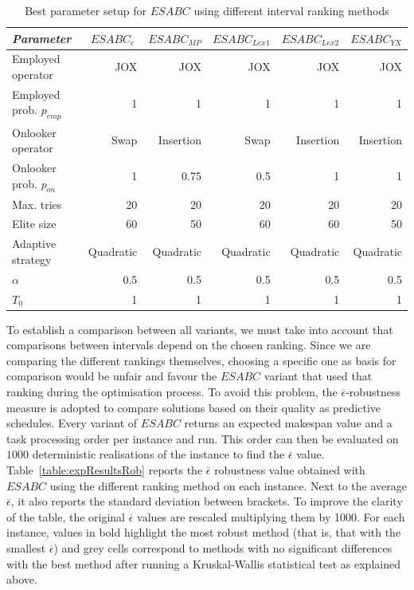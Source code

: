 \documentclass[icae]{iosart2x}
\newcommand{\reviewed}[1]{#1} %
\begin{document}
\begin{table}[tbh]
\small
\centering
\caption{\label{table:parameterTuning2} \reviewed{Best parameter setup for $ESABC$ using different interval ranking methods}}
\begin{tabular}{l|r|r|r|r|r}
\toprule
\textit{Parameter}  & \multicolumn{1}{c|}{$ESABC_c$} & \multicolumn{1}{c|}{$ESABC_{MP}$} & \multicolumn{1}{c|}{$ESABC_{Lex1}$} & \multicolumn{1}{c|}{$ESABC_{Lex2}$} & \multicolumn{1}{c}{$ESABC_{YX}$} \\
\midrule
Employed operator & JOX & JOX & JOX & JOX  & JOX  \\
Employed prob. $p_{emp}$  & 1 & 1 & 1 & 1 & 1 \\
Onlooker operator  & Swap & Insertion & Swap & Insertion & Insertion\\
Onlooker prob. $p_{on}$  & 1 & 0.75 & 0.5 & 1 & 1 \\
Max. tries & 20 & 20 & 20 & 20& 20\\
Elite size & 60 & 50 & 60 & 60 & 50\\
Adaptive strategy & Quadratic & Quadratic & Quadratic & Quadratic & Quadratic\\
$\alpha $ & 0.5 & 0.5 & 0.5  & 0.5 & 0.5\\
${T_0} $ & 1 & 1 & 1 & 1 & 1\\
\bottomrule
\end{tabular}
\end{table}

To establish a comparison between all variants, we must take into account that comparisons between intervals depend on the chosen ranking. Since we are comparing the different rankings themselves, choosing a specific one as basis for comparison would be unfair and favour the $ESABC$ variant that used that ranking during the optimisation process. To avoid this problem, the $\overline{\epsilon}$-robustness measure is adopted to compare solutions based on their quality as predictive schedules. Every variant of $ESABC$ returns an expected makespan value and a task processing order per instance and run. This order can then be evaluated on $1000$ deterministic realisations of the instance to find the $\overline{\epsilon}$ value.  \reviewed{Table~\ref{table:expResultsRob} reports the $\overline{\epsilon}$ robustness value obtained with $ESABC$ using the different ranking method on each instance.  Next to the average $\overline{\epsilon}$, it also reports the standard deviation between brackets.  To improve the clarity of the table,  the original $\overline{\epsilon}$ values are rescaled multiplying them by 1000.  For each instance, values in bold highlight the most robust method (that is, that with the smallest $\overline{\epsilon}$) and grey cells correspond to methods with no significant differences with the best method after running a Kruskal-Wallis statistical test as explained above}.
\end{document}
